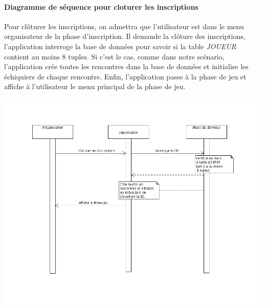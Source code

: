 \documentclass[10pt,a4paper]{report}
\begin{document}
\paragraph{Diagramme de séquence pour cloturer les inscriptions}Pour clôturer les inscriptions, on admettra que l'utilisateur est dans le menu organisateur de la phase d'inscription. Il demande la clôture des inscriptions, l'application interroge la base de données pour savoir si la table \textit{JOUEUR} contient au moins 8 tuples. Si c'est le cas, comme dans notre scénario, l'application crée toutes les rencontres dans la base de données et initialise les échiquiers de chaque rencontre. Enfin, l'application passe à la phase de jeu et affiche à l'utilisateur le menu principal de la phase de jeu. 
\begin{center}
\includegraphics[width=18cm]{DiagSeqCloture.png}
\end{center}
\end{document}
